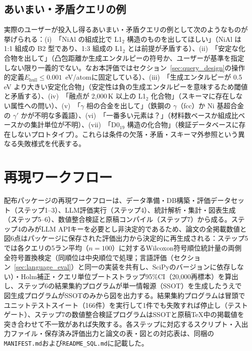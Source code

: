 \documentclass[twocolumn]{interact}
\begin{document}
\subsection{あいまい・矛盾クエリの例}
\label{sec:sup_ambiguous}

実際のユーザーが投入し得るあいまい・矛盾クエリの例として次のようなものが挙げられる：(i)~「NiAl の組成比で L1$_2$ 構造のものを出してほしい」（NiAl は 1:1 組成の B2 型であり、1:3 組成の L1$_2$ とは前提が矛盾する）、(ii)~「安定な化合物を出して」（凸包距離か生成エンタルピーの符号か、ユーザーが基準を指定しない限り一義的でない。なお本評価ではセクション~\ref{sec:query_design}の操作的定義$E_\text{hull} \leq 0.001$~eV/atomに固定している）、(iii)~「生成エンタルピーが 0.5\,eV より大きい安定化合物」（安定性は負の生成エンタルピーを意味するため閾値と矛盾する）、(iv)~「融点が 2{,}000\,K 以上の L1$_2$ 化合物」（スキーマに存在しない属性への問い）、(v)~「$\gamma$ 相の合金を出して」（鉄鋼の $\gamma$（fcc）か Ni 基超合金の $\gamma'$ かが不明な多義語）、(vi)~「一番多い元素は？」（材料数ベースか組成比ベースかの集計単位が不明）、(vii)~「D0$_{19}$ 構造の化合物」（検証データベースに存在しないプロトタイプ）。これらは条件の欠落・矛盾・スキーマ外参照という異なる失敗様式を代表する。

\section{再現ワークフロー}
\label{sec:sup_workflow}

配布パッケージの再現ワークフローは、データ準備・DB構築・評価データセット（ステップ1--3）、LLM評価実行（ステップ4）、統計解析・集計・図表生成（ステップ5--6）、数値整合検証と原稿コンパイル（ステップ7）から成る。ステップ4のみがLLM APIキーを必要とし非決定的であるため、論文の全掲載数値と図6点はパッケージに保存された評価出力から決定的に再生成される：ステップ5では各クエリの5ラン平均（$n=100$）に対するWilcoxon符号順位統計量の両側全符号置換検定（同順位は中央順位で処理；言語評価（セクション~\ref{sec:language_eval}）と同一の実装を共有し、SciPyのバージョンに依存しない）・Holm補正・クエリ単位ブートストラップ95\%CI（20{,}000再標本）を算出し、ステップ6の結果集約プログラムが単一情報源（SSOT）を生成したうえで図生成プログラムがSSOTのみから図を出力する。結果集約プログラムは冒頭でユニットテストスイート（166件）を実行して1件でも失敗すれば停止し（テストゲート）、ステップ7の数値整合検証プログラムはSSOTと原稿TeX中の掲載値を突き合わせて不一致があれば失敗する。各ステップに対応するスクリプト・入出力ファイル・保存済み評価出力と論文の表・図との対応表は、同梱の\texttt{MANIFEST.md}および\texttt{README\_SQL.md}に記載した。
\end{document}
